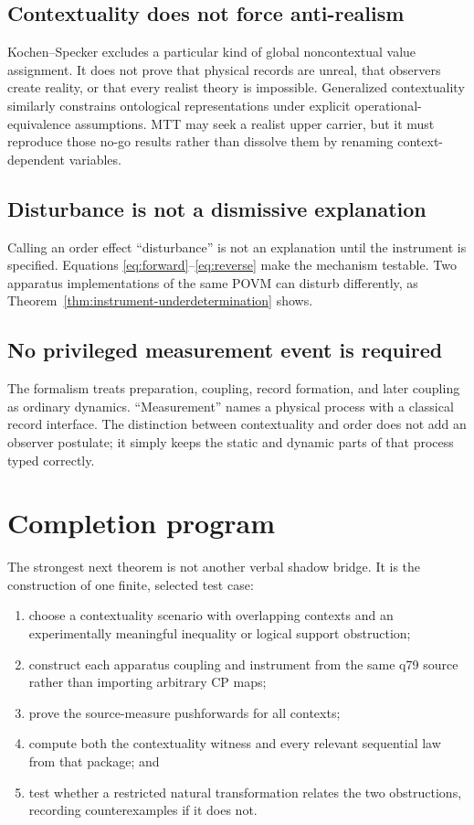 \documentclass[11pt]{article}
\begin{document}
\subsection{Contextuality does not force anti-realism}

Kochen--Specker excludes a particular kind of global noncontextual value
assignment. It does not prove that physical records are unreal, that
observers create reality, or that every realist theory is impossible.
Generalized contextuality similarly constrains ontological representations
under explicit operational-equivalence assumptions. MTT may seek a realist
upper carrier, but it must reproduce those no-go results rather than dissolve
them by renaming context-dependent variables.

\subsection{Disturbance is not a dismissive explanation}

Calling an order effect ``disturbance'' is not an explanation until the
instrument is specified. Equations
\eqref{eq:forward}--\eqref{eq:reverse} make the mechanism testable. Two
apparatus implementations of the same POVM can disturb differently, as
Theorem~\ref{thm:instrument-underdetermination} shows.

\subsection{No privileged measurement event is required}

The formalism treats preparation, coupling, record formation, and later
coupling as ordinary dynamics. ``Measurement'' names a physical process with a
classical record interface. The distinction between contextuality and order
does not add an observer postulate; it simply keeps the static and dynamic
parts of that process typed correctly.

\section{Completion program}

The strongest next theorem is not another verbal shadow bridge. It is the
construction of one finite, selected test case:
\begin{enumerate}
\item choose a contextuality scenario with overlapping contexts and an
experimentally meaningful inequality or logical support obstruction;
\item construct each apparatus coupling and instrument from the same q79
source rather than importing arbitrary CP maps;
\item prove the source-measure pushforwards for all contexts;
\item compute both the contextuality witness and every relevant sequential
law from that package; and
\item test whether a restricted natural transformation relates the two
obstructions, recording counterexamples if it does not.
\end{enumerate}
\end{document}
